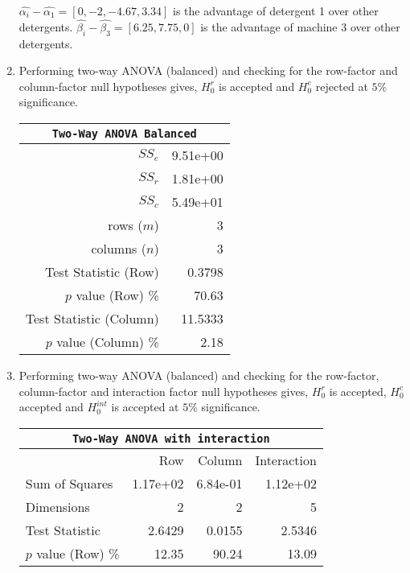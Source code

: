 \begin{enumerate}
	$ \widehat{\alpha_i} - \widehat{\alpha_1} = [ 0, -2, -4.67, 3.34 ] $ is the advantage of detergent 1 over other detergents.
	$ \widehat{\beta_i} - \widehat{\beta_3} = [6.25, 7.75, 0  ] $ is the advantage of machine 3 over other detergents.
	
	\item Performing two-way ANOVA (balanced) and checking for the row-factor and column-factor null hypotheses gives,
	$ H_0^r $ is accepted and $ H_0^c $ rejected at $ 5\% $ significance.
	
	\begin{table}[H]
		\centering
		\begin{tabular}{@{}rr@{}}
			\toprule
			\multicolumn{2}{c}{\texttt{Two-Way ANOVA Balanced}} \\
			\midrule
			$SS_e$                  &               9.51e+00 \\
			$SS_r$                  &               1.81e+00 \\
			$SS_c$                  &               5.49e+01 \\
			rows ($m$)              &                      3 \\
			columns ($n$)           &                      3 \\
			Test Statistic (Row)    &                 0.3798 \\
			$p$ value (Row) \%      &                  70.63 \\
			Test Statistic (Column) &                11.5333 \\
			$p$ value (Column) \%   &                   2.18 \\
			\bottomrule
		\end{tabular}
		
		\bigskip
	\end{table}

	
	\item Performing two-way ANOVA (balanced) and checking for the row-factor, column-factor and interaction factor null hypotheses gives,
	$ H_0^r $ is accepted, $ H_0^c $ accepted and $ H_0^{int} $ is accepted at $ 5\% $ significance.
	
	\begin{table}[H]
		\centering
		\begin{tabular}{@{}lrrr@{}}
			\toprule
			\multicolumn{4}{c}{\texttt{Two-Way ANOVA with interaction}}\\ 
			\midrule
			{} &       Row &    Column & Interaction \\
			\midrule
			Sum of Squares     &  1.17e+02 &  6.84e-01 &    1.12e+02 \\
			Dimensions         &         2 &         2 &           5 \\
			Test Statistic     &    2.6429 &    0.0155 &      2.5346 \\
			$p$ value (Row) \% &     12.35 &     90.24 &       13.09 \\
			\bottomrule
		\end{tabular}
		

\end{table}
\end{enumerate}
